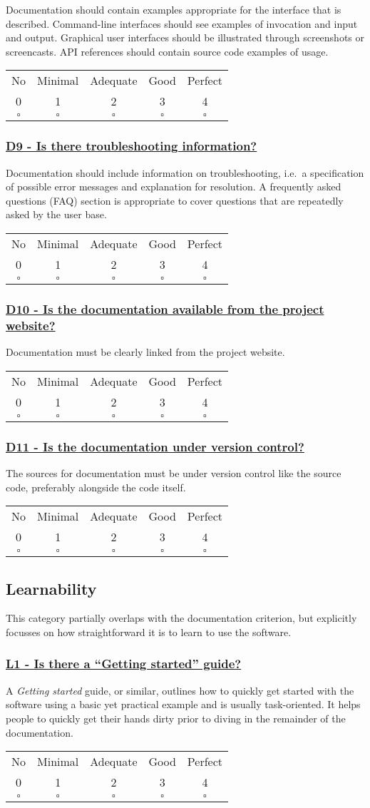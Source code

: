 \documentclass[a4paper,11pt]{article}
\newcommand{\criterion}[2]{\subsubsection*{\underline{#1 - #2}}\label{id:#1}}
\newcommand\CheckTable{%
  \begin{tabular}{ccccc}
    No & Minimal & Adequate & Good & Perfect \\
    0 & 1 & 2 & 3 & 4 \\
    \hline
    $\square$ & $\square$ & $\square$ & $\square$ & $\square$ \\
  \end{tabular}%
}
\begin{document}
Documentation should contain examples appropriate for the interface that is
described. Command-line interfaces should see examples of invocation and input
and output. Graphical user interfaces should be illustrated through screenshots or
screencasts. API references should contain source code examples of usage.

\CheckTable

\newcommand{\dNineID}{D9}
\newcommand{\dNineText}{Is there troubleshooting information?}
\criterion{\dNineID}{\dNineText}

Documentation should include information on troubleshooting, i.e.\ a
specification of possible error messages and explanation for resolution. A
frequently asked questions (FAQ) section is appropriate to cover questions
that are repeatedly asked by the user base.

\CheckTable

\newcommand{\dTenID}{D10}
\newcommand{\dTenText}{Is the documentation available from the project website?}
\criterion{\dTenID}{\dTenText}

Documentation must be clearly linked from the project website.

\CheckTable

\newcommand{\dElevenID}{D11}
\newcommand{\dElevenText}{Is the documentation under version control?}
\criterion{\dElevenID}{\dElevenText}

The sources for documentation must be under version control like the source
code, preferably alongside the code itself.

\CheckTable

\subsection{Learnability}\label{sec:lea}

This category partially overlaps with the documentation criterion, but explicitly
focusses on how straightforward it is to learn to use the software.

\newcommand{\lOneID}{L1}
\newcommand{\lOneText}{Is there a ``Getting started'' guide?}
\criterion{\lOneID}{\lOneText}

A \textit{Getting started} guide, or similar, outlines how to quickly get
started with the software using a basic yet practical example and is usually task-oriented.
It helps people to quickly get their hands dirty prior to diving in the
remainder of the documentation. 

\CheckTable
\end{document}
